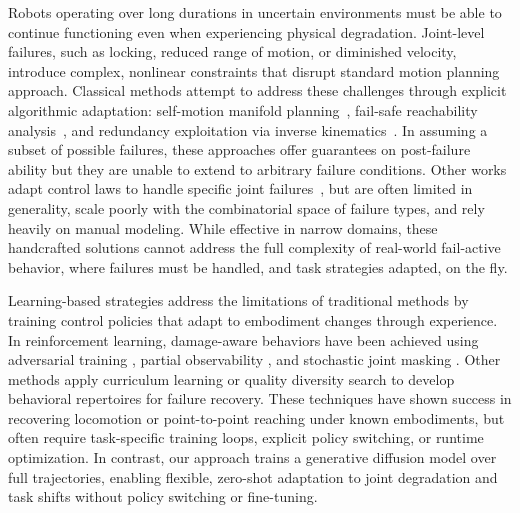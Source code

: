 Robots operating over long durations in uncertain environments must be able to continue functioning even when experiencing physical degradation. Joint-level failures, such as locking, reduced range of motion, or diminished velocity, introduce complex, nonlinear constraints that disrupt standard motion planning approach. Classical methods attempt to address these challenges through explicit algorithmic adaptation: self-motion manifold planning~\cite{xie2021maximizing}, fail-safe reachability analysis~\cite{porges2021failsafe}, and redundancy exploitation via inverse kinematics~\cite{rayankula2021fault}. In assuming a subset of possible failures, these approaches offer guarantees on post-failure ability but they are unable to extend to arbitrary failure conditions. Other works adapt control laws to handle specific joint failures~\cite{yang2024qp, wang2021ik, khan2023chaos}, but are often limited in generality, scale poorly with the combinatorial space of failure types, and rely heavily on manual modeling. While effective in narrow domains, these handcrafted solutions cannot address the full complexity of real-world fail-active behavior, where failures must be handled, and task strategies adapted, on the fly.


Learning-based strategies address the limitations of traditional methods by training control policies that adapt to embodiment changes through experience. In reinforcement learning, damage-aware behaviors have been achieved using adversarial training \cite{yang2021adversarial}, partial observability \cite{pham2024adaptive}, and stochastic joint masking \cite{kim2024quadrupedal}. Other methods apply curriculum learning \cite{okamoto2022acdr} or quality diversity search \cite{cully2015qd, allard2023hierarchical} to develop behavioral repertoires for failure recovery.
These techniques have shown success in recovering locomotion or point-to-point reaching under known embodiments, but often require task-specific training loops, explicit policy switching, or runtime optimization. 
In contrast, our approach trains a generative diffusion model over full trajectories, enabling flexible, zero-shot adaptation to joint degradation and task shifts without policy switching or fine-tuning.

